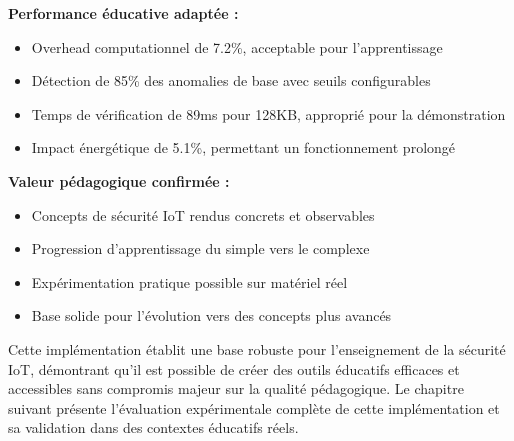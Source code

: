\textbf{Performance éducative adaptée :}
\begin{itemize}
    \item Overhead computationnel de 7.2\%, acceptable pour l'apprentissage
    \item Détection de 85\% des anomalies de base avec seuils configurables
    \item Temps de vérification de 89ms pour 128KB, approprié pour la démonstration
    \item Impact énergétique de 5.1\%, permettant un fonctionnement prolongé
\end{itemize}

\textbf{Valeur pédagogique confirmée :}
\begin{itemize}
    \item Concepts de sécurité IoT rendus concrets et observables
    \item Progression d'apprentissage du simple vers le complexe
    \item Expérimentation pratique possible sur matériel réel
    \item Base solide pour l'évolution vers des concepts plus avancés
\end{itemize}

Cette implémentation établit une base robuste pour l'enseignement de la sécurité IoT, démontrant qu'il est possible de créer des outils éducatifs efficaces et accessibles sans compromis majeur sur la qualité pédagogique. Le chapitre suivant présente l'évaluation expérimentale complète de cette implémentation et sa validation dans des contextes éducatifs réels.